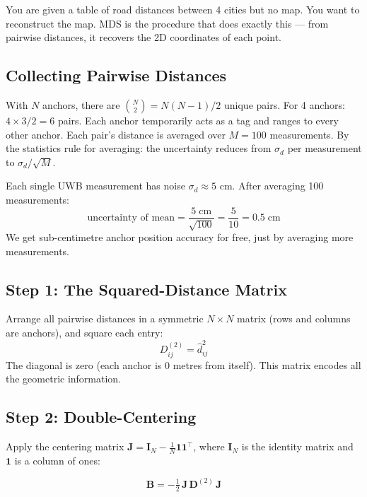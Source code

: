 \documentclass[11pt,a4paper]{article}
\newcommand{\vect}[1]{\bm{#1}}
\newcommand{\mat}[1]{\mathbf{#1}}
\begin{document}
\begin{analogy}
You are given a table of road distances between 4 cities but no map. You want to reconstruct the map. MDS is the procedure that does exactly this --- from pairwise distances, it recovers the 2D coordinates of each point.
\end{analogy}

\subsection{Collecting Pairwise Distances}

With $N$ anchors, there are $\binom{N}{2} = N(N-1)/2$ unique pairs. For 4 anchors: $4 \times 3/2 = 6$ pairs. Each anchor temporarily acts as a tag and ranges to every other anchor. Each pair's distance is averaged over $M = 100$ measurements. By the statistics rule for averaging: the uncertainty reduces from $\sigma_d$ per measurement to $\sigma_d/\sqrt{M}$.

\begin{worked}
Each single UWB measurement has noise $\sigma_d \approx 5$ cm. After averaging 100 measurements:
\[
\text{uncertainty of mean} = \frac{5\;\text{cm}}{\sqrt{100}} = \frac{5}{10} = 0.5\;\text{cm}
\]
We get sub-centimetre anchor position accuracy for free, just by averaging more measurements.
\end{worked}

\subsection{Step 1: The Squared-Distance Matrix}

Arrange all pairwise distances in a symmetric $N \times N$ matrix (rows and columns are anchors), and square each entry:
\[
D^{(2)}_{ij} = \hat{d}_{ij}^2
\]
The diagonal is zero (each anchor is 0 metres from itself). This matrix encodes all the geometric information.

\subsection{Step 2: Double-Centering}

Apply the centering matrix $\mat{J} = \mat{I}_N - \tfrac{1}{N}\vect{1}\vect{1}^\top$, where $\mat{I}_N$ is the identity matrix and $\vect{1}$ is a column of ones:

\begin{equation}
\mat{B} = -\tfrac{1}{2}\,\mat{J}\,\mat{D}^{(2)}\,\mat{J}
\label{eq:mds}
\end{equation}
\end{document}
